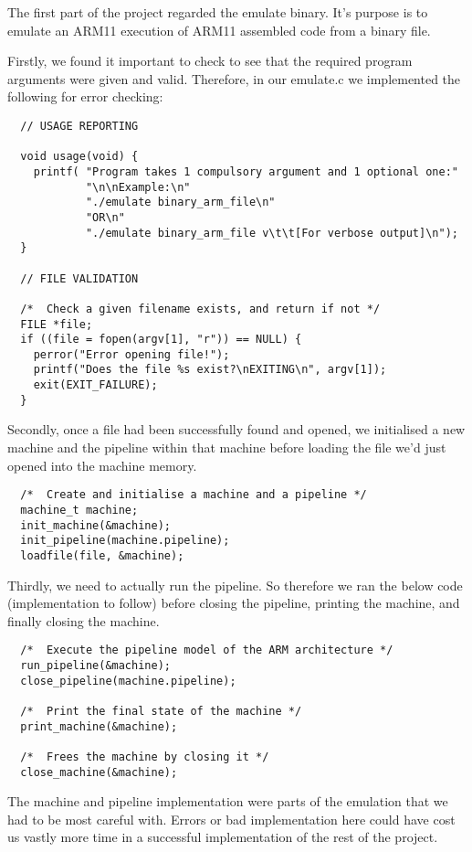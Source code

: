 The first part of the project regarded the emulate binary. It's purpose is to emulate an ARM11 execution of ARM11 assembled code from a binary file.

Firstly, we found it important to check to see that the required program arguments were given and valid. Therefore, in our emulate.c we implemented the following for error checking:

\begin{verbatim}
  // USAGE REPORTING
  
  void usage(void) {
    printf( "Program takes 1 compulsory argument and 1 optional one:"
            "\n\nExample:\n"
            "./emulate binary_arm_file\n"
            "OR\n"
            "./emulate binary_arm_file v\t\t[For verbose output]\n");
  }
  
  // FILE VALIDATION
  
  /*  Check a given filename exists, and return if not */
  FILE *file;
  if ((file = fopen(argv[1], "r")) == NULL) {
    perror("Error opening file!");
    printf("Does the file %s exist?\nEXITING\n", argv[1]);
    exit(EXIT_FAILURE);
  }
\end{verbatim}

Secondly, once a file had been successfully found and opened, we initialised a new machine and the pipeline within that machine before loading the file we'd just opened into the machine memory.

\begin{verbatim}
  /*  Create and initialise a machine and a pipeline */
  machine_t machine;
  init_machine(&machine);
  init_pipeline(machine.pipeline);
  loadfile(file, &machine);
\end{verbatim}

Thirdly, we need to actually run the pipeline. So therefore we ran the below code (implementation to follow) before closing the pipeline, printing the machine, and finally closing the machine.

\begin{verbatim}
  /*  Execute the pipeline model of the ARM architecture */
  run_pipeline(&machine);
  close_pipeline(machine.pipeline);

  /*  Print the final state of the machine */
  print_machine(&machine);

  /*  Frees the machine by closing it */
  close_machine(&machine);
\end{verbatim}

The machine and pipeline implementation were parts of the emulation that we had to be most careful with. Errors or bad implementation here could have cost us vastly more time in a successful implementation of the rest of the project.

